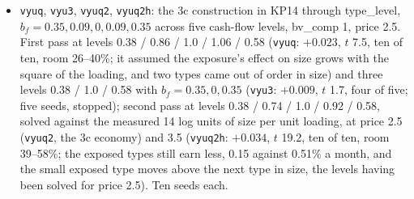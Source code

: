 \begin{itemize}
\item \texttt{vyuq}, \texttt{vyu3}, \texttt{vyuq2}, \texttt{vyuq2h}: the 3c construction in KP14 through type\_level, $b_f = 0.35, 0.09, 0, 0.09, 0.35$ across five cash-flow levels, bv\_comp 1, price 2.5. First pass at levels 0.38 / 0.86 / 1.0 / 1.06 / 0.58 (\texttt{vyuq}: $+0.023$, $t$ 7.5, ten of ten, room 26--40\%; it assumed the exposure's effect on size grows with the square of the loading, and two types came out of order in size) and three levels 0.38 / 1.0 / 0.58 with $b_f = 0.35, 0, 0.35$ (\texttt{vyu3}: $+0.009$, $t$ 1.7, four of five; five seeds, stopped); second pass at levels 0.38 / 0.74 / 1.0 / 0.92 / 0.58, solved against the measured 14 log units of size per unit loading, at price 2.5 (\texttt{vyuq2}, the 3c economy) and 3.5 (\texttt{vyuq2h}: $+0.034$, $t$ 19.2, ten of ten, room 39--58\%; the exposed types still earn less, 0.15 against 0.51\% a month, and the small exposed type moves above the next type in size, the levels having been solved for price 2.5). Ten seeds each.
\end{itemize}
